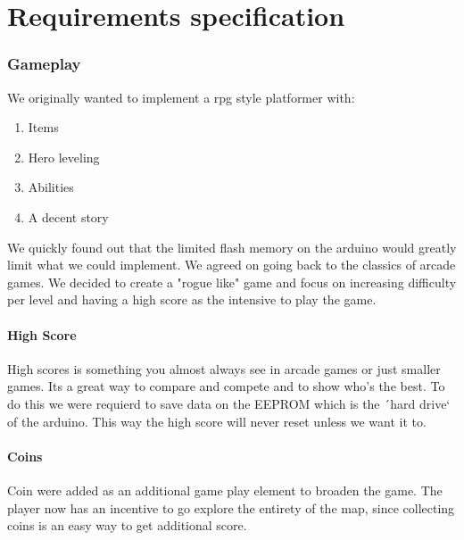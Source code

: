 \chapter{Requirements specification}

\subsection{Gameplay}%
We originally wanted to implement a rpg style platformer with:
\begin{enumerate}
\item Items
\item Hero leveling
\item Abilities
\item A decent story
\end{enumerate}
We quickly found out that the limited flash memory on the arduino would greatly limit what we could implement. We agreed on going back to the classics of arcade games. We decided to create a "rogue like" game and focus on increasing difficulty per level and having a high score as the intensive to play the game.

\subsubsection{High Score}
High scores is something you almost always see in arcade games or just smaller games. Its a great way to compare and compete and to show who's the best.
To do this we were requierd to save data on the EEPROM which is the ´hard drive` of the arduino. This way the high score will never reset unless we want it to.

\subsubsection{Coins}
Coin were added as an additional game play element to broaden the game. The player now has an incentive to go explore the entirety of the map, since collecting coins is an easy way to get additional score.



